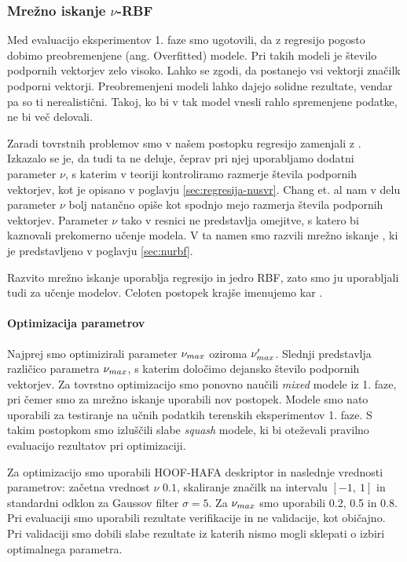 \subsubsection{Mrežno iskanje \texorpdfstring{$\nu$}{nu}-RBF}
Med evaluacijo eksperimentov 1. faze smo ugotovili, da z regresijo \esvr pogosto dobimo preobremenjene (ang. Overfitted) modele. Pri takih modeli je število podpornih vektorjev zelo visoko. Lahko se zgodi, da postanejo vsi vektorji značilk podporni vektorji. Preobremenjeni modeli lahko dajejo solidne rezultate, vendar pa so ti nerealistični. Takoj, ko bi v tak model vnesli rahlo spremenjene podatke, ne bi več delovali.

Zaradi tovrstnih problemov smo v našem postopku regresijo \esvr zamenjali z \nusvr. Izkazalo se je, da tudi ta ne deluje, čeprav pri njej uporabljamo dodatni parameter $\nu$, s katerim v teoriji kontroliramo razmerje števila podpornih vektorjev, kot je opisano v poglavju \ref{sec:regresija-nusvr}. Chang et. al nam v delu \cite{chang2002training} parameter $\nu$ bolj natančno opiše kot spodnjo mejo razmerja števila podpornih vektorjev. Parameter $\nu$ tako v resnici ne predstavlja omejitve, s katero bi kaznovali prekomerno učenje modela. V ta namen smo razvili mrežno iskanje \nurbf, ki je predstavljeno v poglavju \ref{sec:nurbf}. 

Razvito mrežno iskanje uporablja regresijo \nusvr in jedro RBF, zato smo ju uporabljali tudi za učenje modelov. Celoten postopek krajše imenujemo kar \nurbf.


\paragraph{Optimizacija parametrov}
Najprej smo optimizirali parameter $\nu_{max}$ oziroma $\nu_{max}'$. Slednji predstavlja različico parametra $\nu_{max}$, s katerim določimo dejansko število podpornih vektorjev. Za tovrstno optimizacijo smo ponovno naučili \textit{mixed} modele iz 1. faze, pri čemer smo za mrežno iskanje uporabili nov postopek. Modele smo nato uporabili za testiranje na učnih podatkih terenskih eksperimentov 1. faze. S takim postopkom smo izluščili slabe \textit{squash} modele, ki bi oteževali pravilno evaluacijo rezultatov pri optimizaciji.

Za optimizacijo smo uporabili HOOF-HAFA deskriptor in naslednje vrednosti parametrov: začetna vrednost $\nu$ $0.1$, skaliranje značilk na intervalu $[-1,~1]$ in standardni odklon za Gaussov filter $\sigma=5$. Za $\nu_{max}$ smo uporabili \num{0.2}, \num{0.5} in \num{0.8}. Pri evaluaciji smo uporabili rezultate verifikacije in ne validacije, kot običajno. Pri validaciji smo dobili slabe rezultate iz katerih nismo mogli sklepati o izbiri optimalnega parametra.

